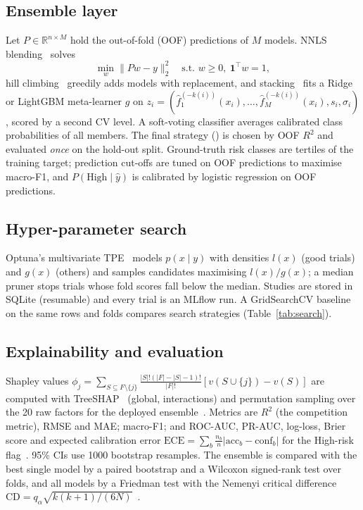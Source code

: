 \documentclass[conference]{IEEEtran}
\providecommand{\FGBootstrap}{1000}\providecommand{\FGFolds}{5}
\begin{document}
\subsection{Ensemble layer}
Let $P\in\mathbb{R}^{n\times M}$ hold the out-of-fold (OOF) predictions of $M$ models. NNLS blending~\cite{breiman1996}
solves
\begin{equation}
\min_{w}\lVert Pw-y\rVert_2^2\quad\text{s.t. } w\ge 0,\ \mathbf{1}^\top w=1,
\end{equation}
hill climbing~\cite{caruana2004} greedily adds models with replacement, and stacking~\cite{wolpert1992} fits a Ridge or
LightGBM meta-learner $g$ on $z_i=(\hat f_1^{(-k(i))}(x_i),\dots,\hat f_M^{(-k(i))}(x_i),s_i,\sigma_i)$, scored by a
second CV level. A soft-voting classifier averages calibrated class probabilities of all members. The final strategy
(\FGEnsembleStrategy) is chosen by OOF $R^2$ and evaluated \emph{once} on the hold-out split.
Ground-truth risk classes are tertiles of the training target; prediction cut-offs are tuned on OOF predictions to
maximise macro-F1, and $P(\text{High}\mid\hat y)$ is calibrated by logistic regression on OOF predictions.

\subsection{Hyper-parameter search}
Optuna's multivariate TPE~\cite{bergstra2011,akiba2019} models $p(x\mid y)$ with densities $l(x)$ (good trials) and
$g(x)$ (others) and samples candidates maximising $l(x)/g(x)$; a median pruner stops trials whose fold scores fall below
the median. Studies are stored in SQLite (resumable) and every trial is an MLflow run. A GridSearchCV baseline on the
same rows and folds compares search strategies (Table~\ref{tab:search}).

\subsection{Explainability and evaluation}
Shapley values $\phi_j=\sum_{S\subseteq F\setminus\{j\}}\frac{|S|!(|F|-|S|-1)!}{|F|!}[v(S\cup\{j\})-v(S)]$ are computed
with TreeSHAP~\cite{lundberg2020} (global, interactions) and permutation sampling over the 20 raw factors for the deployed
ensemble~\cite{lundberg2017}. Metrics are $R^2$ (the competition metric), RMSE and MAE; macro-F1; and ROC-AUC, PR-AUC,
log-loss, Brier score and expected calibration error $\mathrm{ECE}=\sum_b\frac{n_b}{n}|\mathrm{acc}_b-\mathrm{conf}_b|$
for the High-risk flag~\cite{guo2017}. 95\% CIs use \FGBootstrap{} bootstrap resamples. The ensemble is compared with the
best single model by a paired bootstrap and a Wilcoxon signed-rank test over folds, and all models by a Friedman test with
the Nemenyi critical difference $\mathrm{CD}=q_\alpha\sqrt{k(k+1)/(6N)}$~\cite{demsar2006}.
\end{document}
